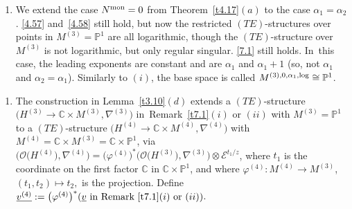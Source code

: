\documentclass[10pt,a4paper]{amsart}
\numberwithin{equation}{section}
\numberwithin{figure}{section}
\newcommand{\C}{{\mathbb C}}
\renewcommand{\P}{{\mathbb P}}
\newcommand{\EE}{{\mathcal E}}
\newcommand{\OO}{{\mathcal O}}
\newcommand{\uuuu}{\underline}
\newcommand{\nnn}{\nabla}
\begin{document}
\begin{Remarks}
\begin{enumerate}
\item[$(ii)$] We extend the case $N^{\rm mon}=0$ from Theorem~\ref{t4.17}$(a)$ to the case $\alpha_1=\alpha_2$.
\eqref{4.57} and~\eqref{4.58} still hold,
but now the restricted $(TE)$-structures over
points in $M^{(3)}=\P^1$ are all logarithmic,
though the $(TE)$-structure over $M^{(3)}$ is not
logarithmic, but only regular singular.
\eqref{7.1} still holds. In~this case, the leading exponents are constant
and are $\alpha_1$ and $\alpha_1+1$
(so, not $\alpha_1$ and $ \alpha_2=\alpha_1$).
Similarly to $(i)$, the base space is called
$M^{(3),0,\alpha_1,{\rm log}}\cong\P^1$.
\end{enumerate}
\end{Remarks}


\begin{Remarks}\label{t7.2}\quad

\begin{enumerate}\itemsep=0pt
\item[$(i)$] The construction in Lemma~\ref{t3.10}$(d)$
extends a $(TE)$-structure
$\big(H^{(3)}\to\C\times M^{(3)},\nnn^{(3)}\big)$ in~Remark~\ref{t7.1}$(i)$ or $(ii)$
with $M^{(3)}=\P^1$ to a $(TE)$-structure
$\big(H^{(4)}\to\C\times M^{(4)},\nnn^{(4)}\big)$ with
$M^{(4)}=\C\times M^{(3)}=\C\times \P^1$, via
$\big(\OO\big(H^{(4)}\big),\nnn^{(4)}\big)=\big(\varphi^{(4)}\big)^*
\big(\OO\big(H^{(3)}\big),\nnn^{(3)}\big)\otimes \EE^{t_1/z}$,
where $t_1$ is the coordinate on the first factor $\C$
in $\C\times\P^1$, and where $\varphi^{(4)}\colon M^{(4)}\to
M^{(3)}$, $(t_1,t_2)\mapsto t_2,$ is the projection.
Define $\uuuu{v^{(4)}}:=\big(\varphi^{(4)}\big)^*
(\uuuu{v}\text{ in Remark~\ref{t7.1}$(i)$ or $(ii)$})$.


\end{enumerate}
\end{Remarks}
\end{document}
